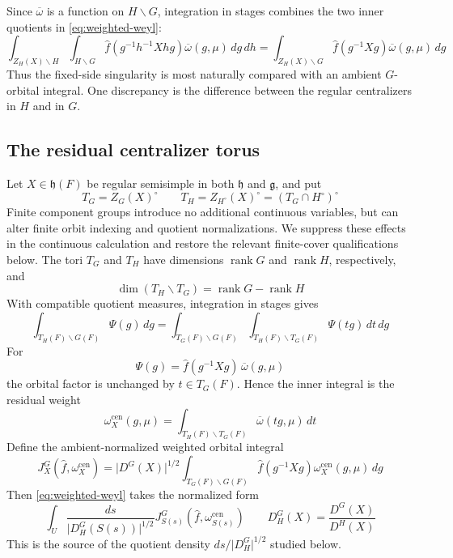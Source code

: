 \documentclass[11pt]{amsart}
\theoremstyle{definition}
\theoremstyle{remark}
\newcommand{\rank}{\operatorname{rank}}
\newcommand{\abs}[1]{\lvert #1\rvert}
\newcommand{\g}{\mathfrak g}
\newcommand{\h}{\mathfrak h}
\begin{document}
Since $\overline\omega$ is a function on $H\backslash G$, integration in
stages combines the two inner quotients in \eqref{eq:weighted-weyl}:
\begin{equation}\label{eq:fixed-combined-orbit}
 \int_{Z_H(X)\backslash H}\int_{H\backslash G}
   \widehat f(g^{-1}h^{-1}Xhg)\overline\omega(g,\mu)\,dg\,dh
 =\int_{Z_H(X)\backslash G}
   \widehat f(g^{-1}Xg)\overline\omega(g,\mu)\,dg
\end{equation}
Thus the fixed-side singularity is most naturally compared with an ambient
$G$-orbital integral.  One discrepancy is the difference between the
regular centralizers in $H$ and in $G$.

\subsection{The residual centralizer torus}
Let $X\in\h(F)$ be regular semisimple in both $\h$ and $\g$, and put
\[
 T_G=Z_G(X)^\circ\qquad
 T_H=Z_{H^\circ}(X)^\circ=(T_G\cap H^\circ)^\circ
\]
Finite component groups introduce no additional continuous variables, but can
alter finite orbit indexing and quotient normalizations.  We suppress these
effects in the continuous calculation and restore the relevant finite-cover
qualifications below.  The tori $T_G$ and $T_H$ have dimensions
$\rank G$ and $\rank H$, respectively, and
\begin{equation}\label{eq:residual-torus-dimension}
 \dim(T_H\backslash T_G)=\rank G-\rank H
\end{equation}
With compatible quotient measures, integration in stages gives
\begin{equation}\label{eq:centralizer-disintegration}
 \int_{T_H(F)\backslash G(F)}\Psi(g)\,dg
 =\int_{T_G(F)\backslash G(F)}
   \int_{T_H(F)\backslash T_G(F)}\Psi(tg)\,dt\,dg
\end{equation}
For
\[
 \Psi(g)=\widehat f(g^{-1}Xg)\,\overline\omega(g,\mu)
\]
the orbital factor is unchanged by $t\in T_G(F)$.  Hence the inner integral
is the residual weight
\begin{equation}\label{eq:residual-arthur-weight}
 \omega_X^{\mathrm{cen}}(g,\mu)
 =\int_{T_H(F)\backslash T_G(F)}
   \overline\omega(tg,\mu)\,dt
\end{equation}
Define the ambient-normalized weighted orbital integral
\[
 J_X^G(\widehat f,\omega_X^{\mathrm{cen}})
 =\abs{D^G(X)}^{1/2}
   \int_{T_G(F)\backslash G(F)}
      \widehat f(g^{-1}Xg)\omega_X^{\mathrm{cen}}(g,\mu)\,dg
\]
Then \eqref{eq:weighted-weyl} takes the normalized form
\begin{equation}\label{eq:weighted-weyl-normalized}
 \int_U
 \frac{ds}{\abs{D_H^G(S(s))}^{1/2}}
 J_{S(s)}^G(\widehat f,\omega_{S(s)}^{\mathrm{cen}})
 \qquad
 D_H^G(X)=\frac{D^G(X)}{D^H(X)}
\end{equation}
This is the source of the quotient density
$ds/\abs{D_H^G}^{1/2}$ studied below.
\end{document}
